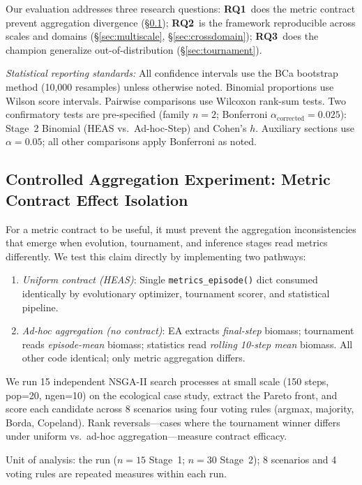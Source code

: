 \documentclass{wscpaperproc}
\begin{document}
Our evaluation addresses three research questions:
\textbf{RQ1}~does the metric contract prevent aggregation divergence
(\S\ref{sec:controlled-agg});
\textbf{RQ2}~is the framework reproducible across scales and domains
(\S\ref{sec:multiscale}, \S\ref{sec:crossdomain});
\textbf{RQ3}~does the champion generalize out-of-distribution
(\S\ref{sec:tournament}).

\emph{Statistical reporting standards:} All confidence intervals use the BCa
bootstrap method (10,000 resamples) unless otherwise noted. Binomial proportions
use Wilson score intervals. Pairwise comparisons use Wilcoxon rank-sum tests.
Two confirmatory tests are pre-specified (family $n\!=\!2$; Bonferroni
$\alpha_{\text{corrected}}\!=\!0.025$): Stage~2 Binomial (HEAS vs.\ Ad-hoc-Step) and
Cohen's $h$. Auxiliary sections use $\alpha\!=\!0.05$; all other comparisons apply
Bonferroni as noted.

\subsection{Controlled Aggregation Experiment: Metric Contract Effect Isolation}
\label{sec:controlled-agg}

For a metric contract to be useful, it must prevent the aggregation inconsistencies
that emerge when evolution, tournament, and inference stages read metrics differently.
We test this claim directly by implementing two pathways:

\begin{enumerate}
\item \emph{Uniform contract (HEAS)}: Single \texttt{metrics\_episode()} dict consumed
identically by evolutionary optimizer, tournament scorer, and statistical pipeline.
\item \emph{Ad-hoc aggregation (no contract)}: EA extracts \emph{final-step} biomass;
tournament reads \emph{episode-mean} biomass; statistics read \emph{rolling 10-step mean}
biomass. All other code identical; only metric aggregation differs.
\end{enumerate}

We run 15 independent NSGA-II search processes at small scale (150 steps, pop=20,
ngen=10) on the ecological case study, extract the Pareto front, and score each
candidate across 8 scenarios using four voting rules (argmax, majority, Borda,
Copeland). Rank reversals---cases where the tournament winner differs under uniform
vs.\ ad-hoc aggregation---measure contract efficacy.

Unit of analysis: the run ($n\!=\!15$ Stage~1; $n\!=\!30$ Stage~2); 8 scenarios and 4 voting rules are repeated measures within each run.
\end{document}
